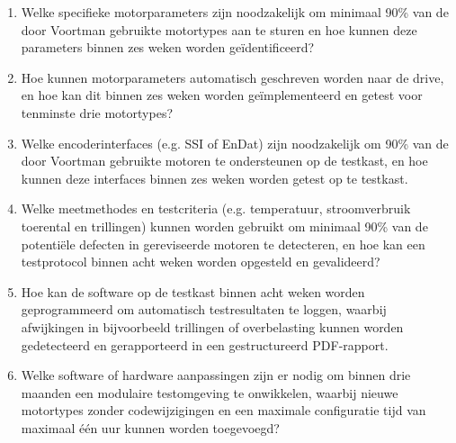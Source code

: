 \begin{enumerate}
	\item Welke specifieke motorparameters zijn noodzakelijk om minimaal 90\% van de door Voortman gebruikte motortypes aan te sturen en hoe kunnen deze parameters binnen zes weken worden geïdentificeerd? \label{OZV:1}
	
	\item Hoe kunnen motorparameters automatisch geschreven worden naar de drive, en hoe kan dit binnen zes weken worden geïmplementeerd en getest voor tenminste drie motortypes? \label{OZV:2}
	
	\item Welke encoderinterfaces (e.g. \gls{SSI} of EnDat) zijn noodzakelijk om 90\% van de door Voortman gebruikte motoren te ondersteunen op de testkast, en hoe kunnen deze interfaces binnen zes weken worden getest op te testkast. \label{OZV:3}
	
	\item Welke meetmethodes en testcriteria (e.g. temperatuur, stroomverbruik toerental en trillingen) kunnen worden gebruikt om minimaal 90\% van de potentiële defecten in gereviseerde motoren te detecteren, en hoe kan een testprotocol binnen acht weken worden opgesteld en gevalideerd? \label{OZV:4}
	
	\item Hoe kan de software op de testkast binnen acht weken worden geprogrammeerd om automatisch testresultaten te loggen, waarbij afwijkingen in bijvoorbeeld trillingen of overbelasting kunnen worden gedetecteerd en gerapporteerd in een gestructureerd \gls{PDF}-rapport. \label{OZV:5}
	
	\item Welke software of hardware aanpassingen zijn er nodig om binnen drie maanden een modulaire testomgeving te onwikkelen, waarbij nieuwe motortypes zonder codewijzigingen en een maximale configuratie tijd van maximaal één uur kunnen worden toegevoegd? \label{OZV:6}
\end{enumerate}